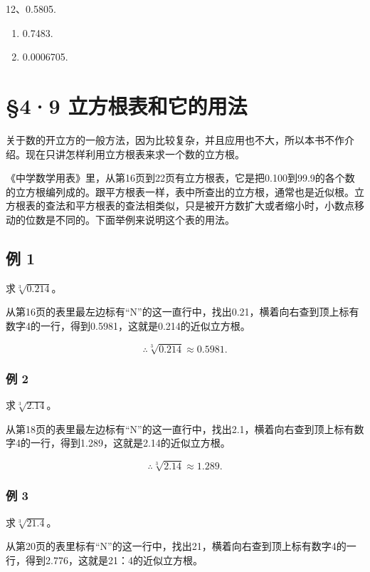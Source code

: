 12、0.5805.

\begin{enumerate}[start=13]
\item
  0.7483.
\item
  0.0006705.
\end{enumerate}

\section{§4·9 立方根表和它的用法}

关于数的开立方的一般方法，因为比较复杂，并且应用也不大，所以本书不作介绍。现在只讲怎样利用立方根表来求一个数的立方根。

《中学数学用表》里，从第16页到22页有立方根表，它是把0.100到99.9的各个数的立方根编列成的。跟平方根表一样，表中所查出的立方根，通常也是近似根。立方根表的查法和平方根表的查法相类似，只是被开方数扩大或者缩小时，小数点移动的位数是不同的。下面举例来说明这个表的用法。

\subsection{例 1}

求\(\sqrt[3]{0.214}\)。

从第16页的表里最左边标有``N''的这一直行中，找出0.21，横着向右查到顶上标有数字4的一行，得到0.5981，这就是0.214的近似立方根。

\[
\therefore \sqrt[3]{0.214} \approx 0.5981.
\]

\subsubsection{例 2}

求\(\sqrt[3]{2.14}\)。

从第18页的表里最左边标有``N''的这一直行中，找出2.1，横着向右查到顶上标有数字4的一行，得到1.289，这就是2.14的近似立方根。

\[
\therefore \sqrt[3]{2.14} \approx 1.289.
\]

\subsubsection{例 3}

求\(\sqrt[3]{21.4}\)。

从第20页的表里标有``N''的这一行中，找出21，横着向右查到顶上标有数字4的一行，得到2.776，这就是21：4的近似立方根。

